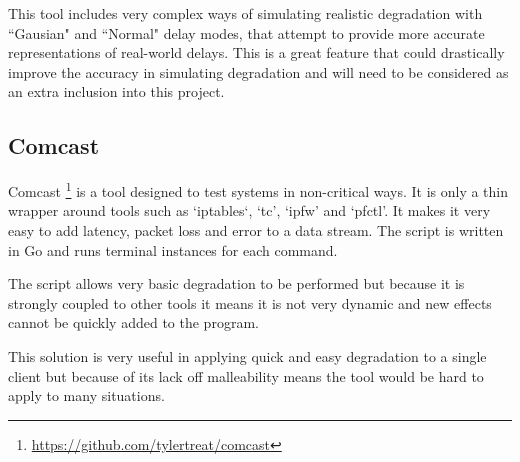 This tool includes very complex ways of simulating realistic degradation with ``Gausian" and ``Normal" delay modes, that attempt to provide more accurate representations of real-world delays. This is a great feature that could drastically improve the accuracy in simulating degradation and will need to be considered as an extra inclusion into this project.

\subsection{Comcast}
Comcast \footnote{\url{https://github.com/tylertreat/comcast}} is a tool designed to test systems in non-critical ways. It is only a thin wrapper around tools such as `iptables`, `tc', `ipfw' and `pfctl'. It makes it very easy to add latency, packet loss and error to a data stream. The script is written in Go and runs terminal instances for each command.

The script allows very basic degradation to be performed but because it is strongly coupled to other tools it means it is not very dynamic and new effects cannot be quickly added to the program.

This solution is very useful in applying quick and easy degradation to a single client but because of its lack off malleability means the tool would be hard to apply to many situations.